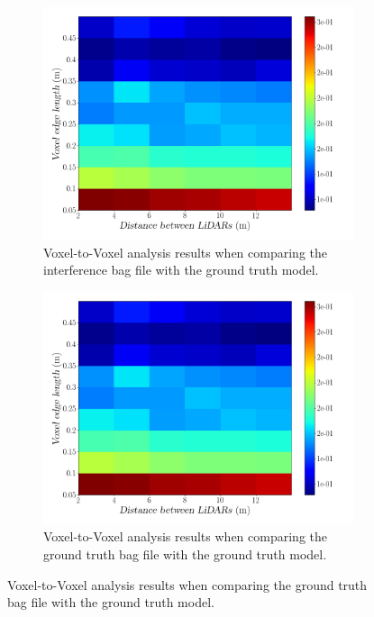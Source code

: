 \begin{figure}[!ht]
\centering
\begin{subfigure}[c]{0.45\textwidth}
	\includegraphics[width=\textwidth]{img/lidar-interference/LOS/octree_interference_color_mesh.png}
	\caption{Voxel-to-Voxel analysis results when comparing the interference bag file with the ground truth model.}
	\label{fig:los:octree-interference-color-mesh}
\end{subfigure}
\qquad
\begin{subfigure}[c]{0.45\textwidth}
	\includegraphics[width=\textwidth]{img/lidar-interference/LOS/octree_ground_truth_color_mesh.png}
	\caption{Voxel-to-Voxel analysis results when comparing the ground truth bag file with the ground truth model.}

\end{subfigure}
\end{figure}
